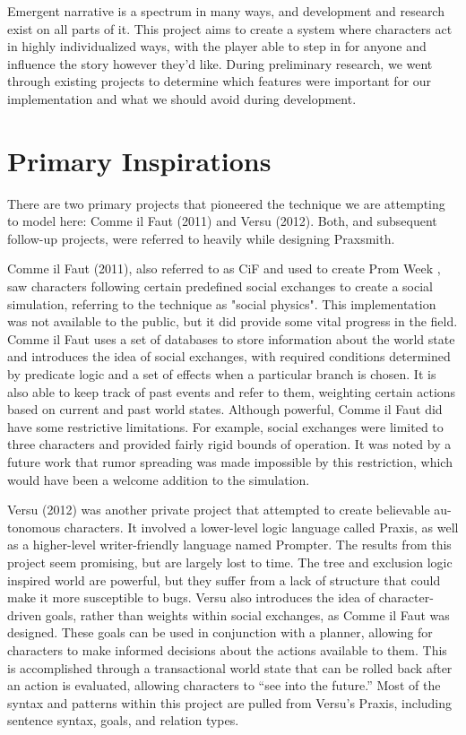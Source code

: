 Emergent narrative is a spectrum in many ways, and development and research exist
on all parts of it. This project aims to create a system where characters act in
highly individualized ways, with the player able to step in for anyone and influence
the story however they'd like. During preliminary research, we went through
existing projects to determine which features were important for our implementation
and what we should avoid during development.

\section{Primary Inspirations} \label{sec:PrimaryInspirations}

There are two primary projects that pioneered the technique we are attempting to
model here: Comme il Faut (2011) and Versu (2012). Both, and subsequent follow-up
projects, were referred to heavily while designing Praxsmith.

Comme il Faut (2011), also referred to as CiF and used to create Prom Week \cite{noauthor_prom_nodate},
saw characters following certain predefined social exchanges to create a social simulation,
referring to the technique as "social physics". \cite{mccoy_comme_2011} This
implementation was not available to the public, but it did provide some vital progress
in the field. Comme il Faut uses a set of databases to store information about the
world state and introduces the idea of social exchanges, with required conditions
determined by predicate logic and a set of effects when a particular branch is chosen.
It is also able to keep track of past events and refer to them, weighting certain
actions based on current and past world states. Although powerful, Comme il Faut
did have some restrictive limitations. For example, social exchanges were limited to
three characters and provided fairly rigid bounds of operation. It was noted by a
future work that rumor spreading was made impossible by this restriction, which would
have been a welcome addition to the simulation. \cite{samuel_ensemble_2015}

Versu (2012) was another private project that attempted to create believable au-
tonomous characters. It involved a lower-level logic language called Praxis, as well
as a higher-level writer-friendly language named Prompter. \cite{evans_ai_2015}
\cite{nelson_prompter_2014} The results from this project seem promising, but are
largely lost to time. The tree and exclusion logic inspired world are powerful,
but they suffer from a lack of structure that could make it more susceptible to bugs.
Versu also introduces the idea of character-driven goals, rather than weights
within social exchanges, as Comme il Faut was designed. These goals can be used in
conjunction with a planner, allowing for characters to make informed decisions about
the actions available to them. This is accomplished through a transactional world state that can
be rolled back after an action is evaluated, allowing characters to ``see into the future.''
Most of the syntax and patterns within this project are pulled from Versu's Praxis,
including sentence syntax, goals, and relation types.

